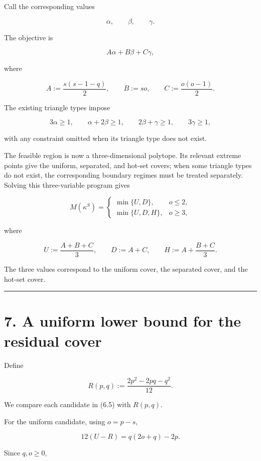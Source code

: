 \documentclass[
  11pt,
]{article}
\begin{document}
Call the corresponding values

\[
\alpha,\qquad\beta,\qquad\gamma.
\]

The objective is

\[
A\alpha+B\beta+C\gamma,
\tag{6.2}
\]

where

\[
A:=\frac{s(s-1-q)}2,
\qquad
B:=so,
\qquad
C:=\frac{o(o-1)}2.
\tag{6.3}
\]

The existing triangle types impose

\[
3\alpha\ge1,
\qquad
\alpha+2\beta\ge1,
\qquad
2\beta+\gamma\ge1,
\qquad
3\gamma\ge1,
\tag{6.4}
\]

with any constraint omitted when its triangle type does not exist.

The feasible region is now a three-dimensional polytope. Its relevant
extreme points give the uniform, separated, and hot-set covers; when
some triangle types do not exist, the corresponding boundary regimes
must be treated separately. Solving this three-variable program gives

\[
M(\kappa^S)
=
\begin{cases}
\min\{U,D\},&o\le2,\\[1mm]
\min\{U,D,H\},&o\ge3,
\end{cases}
\tag{6.5}
\]

where

\[
U:=\frac{A+B+C}{3},
\qquad
D:=A+C,
\qquad
H:=A+\frac{B+C}{3}.
\tag{6.6}
\]

The three values correspond to the uniform cover, the separated cover,
and the hot-set cover.

\begin{center}\rule{0.5\linewidth}{0.5pt}\end{center}

\section{7. A uniform lower bound for the residual
cover}\label{a-uniform-lower-bound-for-the-residual-cover}

Define

\[
R(p,q)
:=
\frac{2p^2-2pq-q^2}{12}.
\tag{7.1}
\]

We compare each candidate in (6.5) with \(R(p,q)\).

For the uniform candidate, using \(o=p-s\),

\[
12(U-R)
=
q(2o+q)-2p.
\tag{7.2}
\]

Since \(q,o\ge0\),
\end{document}
